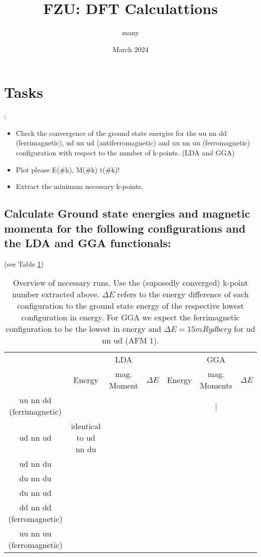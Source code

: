 \documentclass{article}
\title{FZU: DFT Calculattions}
\author{many}
\date{March 2024}
\begin{document}
\maketitle

\section{Tasks }:


\begin{itemize}
    \item Check the convergence of the ground state energies for the uu nn dd (ferrimagnetic), ud nn ud (antiferromagnetic)  and uu nn uu (ferromagnetic) configuration with respect to the number of k-points. (LDA and GGA)
    \item Plot please E(\#k), M(\#k)  t(\#k)!
    \item Extract the minimum necessary k-points.
\end{itemize}




\subsection{Calculate Ground state energies and magnetic momenta for the following 
configurations and the LDA and GGA functionals:}
(see Table \ref{tab:my_label})

\begin{table}
    \centering
    \begin{tabular}{ccccccc}
         &  &  LDA&  &  &  GGA& \\
         &  Energy&  mag. Moment&    $\Delta E$&  Energy&  mag. Moments&   $\Delta E$\\
         uu nn dd (ferrimagnetic) &  &  &  &  &  |& \\
         ud nn ud& identical to ud nn du   &  &  &  &  & \\
         ud nn du &  &  &  &  &  & \\
         du nn du &  &  &  &  &  & \\
         du  nn ud &  &  &  &  &  & \\
        dd nn dd (ferromagnetic)&  &  &  &  &  & \\
        uu nn uu (ferromagnetic)&  &  &  &  &  & \\
    \end{tabular}
    \caption{Overview of necessary runs. Use the (suposedly converged) k-point number extracted above. $\Delta E$ refers to the energy difference of each configuration to the ground state energy of the respective lowest configuration in energy. For GGA we expect the ferrimagnetic configuration to be the lowest in energy and $\Delta E = 15 mRydberg$ for ud nn ud (AFM 1). }
    \label{tab:my_label}
\end{table}
\end{document}
